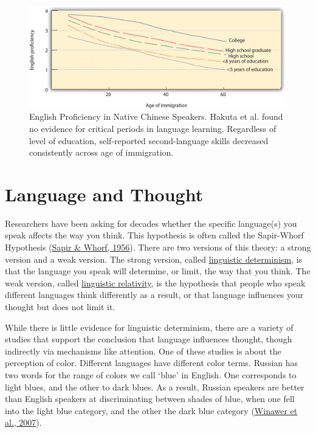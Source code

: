 \documentclass[
]{krantz}
\begin{document}
\begin{figure}

{\centering \includegraphics[width=0.9\linewidth]{images/ch8/fig3} 

}

\caption{English Proficiency in Native Chinese Speakers. Hakuta et al. found no evidence for critical periods in language learning. Regardless of level of education, self-reported second-language skills decreased consistently across age of immigration.}\label{fig:languagelearning}
\end{figure}

\hypertarget{language-and-thought}{%
\section{Language and Thought}\label{language-and-thought}}

Researchers have been asking for decades whether the specific language(s) you speak affects the way you think. This hypothesis is often called the Sapir-Whorf Hypothesis (\protect\hyperlink{ref-sapir-whorf1956}{Sapir \& Whorf, 1956}). There are two versions of this theory: a strong version and a weak version. The strong version, called \protect\hyperlink{linguistic-determinism}{linguistic determinism}, is that the language you speak will determine, or limit, the way that you think. The weak version, called \protect\hyperlink{linguistic-relativity}{linguistic relativity}, is the hypothesis that people who speak different languages think differently as a result, or that language influences your thought but does not limit it.

While there is little evidence for linguistic determinism, there are a variety of studies that support the conclusion that language influences thought, though indirectly via mechanisms like attention. One of these studies is about the perception of color. Different languages have different color terms. Russian has two words for the range of colors we call `blue' in English. One corresponds to light blues, and the other to dark blues. As a result, Russian speakers are better than English speakers at discriminating between shades of blue, when one fell into the light blue category, and the other the dark blue category (\protect\hyperlink{ref-winawer2007}{Winawer et al., 2007}).
\end{document}
